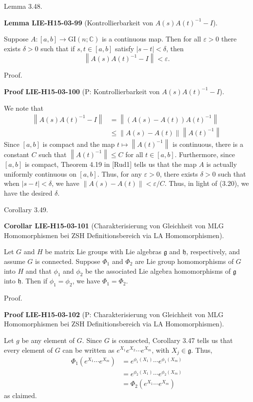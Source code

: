\documentclass[10pt, letterpaper]{article}
\newcommand{\CustomHeading}[3]{%
  \par\medskip\noindent%
  \textbf{#1 #2} \textnormal{(#3)}.\enskip%
}
\newenvironment{LEM}[2]{\begin{unitbox}\CustomHeading{Lemma}{#1}{#2}}{\end{unitbox}}
\newenvironment{KORO}[2]{\begin{unitbox}\CustomHeading{Corollar}{#1}{#2}}{\end{unitbox}}
\newenvironment{PROOF}[2]{\begin{unitbox}\CustomHeading{Proof}{#1}{#2}}{\end{unitbox}}
\begin{document}
Lemma 3.48. 


\begin{LEM}{LIE-H15-03-99}{Kontrollierbarkeit von $A(s)A(t)^{-1}-I$}
Suppose $A:[a, b] \rightarrow \mathrm{GI}(n ; \mathbb{C})$ is a continuous map. Then for all $\varepsilon>0$ there exists $\delta>0$ such that if $s, t \in[a, b]$ satisfy $|s-t|<\delta$, then
$$
\left\|A(s) A(t)^{-1}-I\right\|<\varepsilon .
$$
\end{LEM}


Proof. 

\begin{PROOF}{LIE-H15-03-100}{P: Kontrollierbarkeit von $A(s)A(t)^{-1}-I$}
We note that
$$
\begin{aligned}
\left\|A(s) A(t)^{-1}-I\right\| & =\left\|(A(s)-A(t)) A(t)^{-1}\right\| \\
& \leq\|A(s)-A(t)\|\left\|A(t)^{-1}\right\|
\end{aligned}
$$
Since $[a, b]$ is compact and the map $t \mapsto\left\|A(t)^{-1}\right\|$ is continuous, there is a constant $C$ such that $\left\|A(t)^{-1}\right\| \leq C$ for all $t \in[a, b]$. Furthermore, since $[a, b]$ is compact, Theorem 4.19 in [Rud1] tells us that the map $A$ is actually uniformly continuous on $[a, b]$. Thus, for any $\varepsilon>0$, there exists $\delta>0$ such that when $|s-t|<\delta$, we have $\|A(s)-A(t)\|<\varepsilon / C$. Thus, in light of (3.20), we have the desired $\delta$.
\end{PROOF}




Corollary 3.49. 


\begin{KORO}{LIE-H15-03-101}{Charakterisierung von Gleichheit von MLG Homomorphismen bei ZSH Definitionsbereich via LA Homomorphismen}
Let $G$ and $H$ be matrix Lie groups with Lie algebras $\mathfrak{g}$ and $\mathfrak{h}$, respectively, and assume $G$ is connected. Suppose $\Phi_{1}$ and $\Phi_{2}$ are Lie group homomorphisms of $G$ into $H$ and that $\phi_{1}$ and $\phi_{2}$ be the associated Lie algebra homomorphisms of $\mathfrak{g}$ into $\mathfrak{h}$. Then if $\phi_{1}=\phi_{2}$, we have $\Phi_{1}=\Phi_{2}$.
\end{KORO}

Proof. 

\begin{PROOF}{LIE-H15-03-102}{P: Charakterisierung von Gleichheit von MLG Homomorphismen bei ZSH Definitionsbereich via LA Homomorphismen}
Let $g$ be any element of $G$. Since $G$ is connected, Corollary 3.47 tells us that every element of $G$ can be written as $e^{X_{1}} e^{X_{2}} \cdots e^{X_{m}}$, with $X_{j} \in \mathfrak{g}$. Thus,
$$
\begin{aligned}
\Phi_{1}\left(e^{X_{1}} \cdots e^{X_{m}}\right) & =e^{\phi_{1}\left(X_{1}\right)} \cdots e^{\phi_{1}\left(X_{m}\right)} \\
& =e^{\phi_{2}\left(X_{1}\right)} \cdots e^{\phi_{2}\left(X_{m}\right)} \\
& =\Phi_{2}\left(e^{X_{1}} \cdots e^{X_{m}}\right)
\end{aligned}
$$
as claimed.
\end{PROOF}
\end{document}
